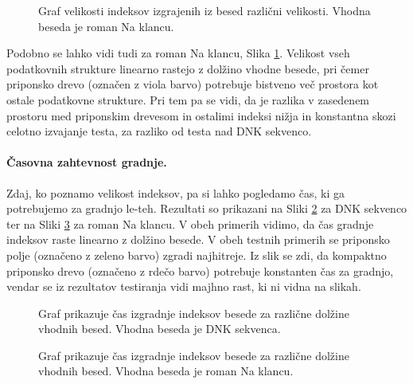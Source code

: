 \begin{figure}[tb]
    \centering
    
    \caption{Graf velikosti indeksov izgrajenih iz besed različni velikosti. Vhodna beseda je roman Na klancu.} 
    \label{fig:VelikostGrafSLO}
\end{figure}

Podobno se lahko vidi tudi za roman Na klancu, Slika \ref{fig:VelikostGrafSLO}. Velikost vseh podatkovnih strukture linearno rastejo z dolžino vhodne besede, pri čemer priponsko drevo (označen z viola barvo) potrebuje bistveno več prostora kot ostale podatkovne strukture. Pri tem pa se vidi, da je razlika v zasedenem prostoru med priponskim drevesom in ostalimi indeksi nižja in konstantna skozi celotno izvajanje testa, za razliko od testa nad DNK sekvenco.


\paragraph{Časovna zahtevnost gradnje.} 

Zdaj, ko poznamo velikost indeksov, pa si lahko pogledamo čas, ki ga potrebujemo za gradnjo le-teh. Rezultati so prikazani na Sliki \ref{fig:IzgradnjaGraf} za DNK sekvenco ter na Sliki \ref{fig:IzgradnjaGrafSLO} za roman Na klancu. V obeh primerih vidimo, da čas gradnje indeksov raste linearno z dolžino besede. V obeh testnih primerih se priponsko polje (označeno z zeleno barvo) zgradi najhitreje. Iz slik se zdi, da kompaktno priponsko drevo (označeno z rdečo barvo) potrebuje konstanten čas za gradnjo, vendar se iz rezultatov testiranja vidi majhno rast, ki ni vidna na slikah.

\begin{figure}[htb]
    \centering
    
    \caption{Graf prikazuje čas izgradnje indeksov besede za različne dolžine vhodnih besed. Vhodna beseda je DNK sekvenca.} 
    \label{fig:IzgradnjaGraf}
\end{figure}

\begin{figure}[htb]
    \centering
    
    \caption{Graf prikazuje čas izgradnje indeksov besede za različne dolžine vhodnih besed. Vhodna beseda je roman Na klancu.} 
    \label{fig:IzgradnjaGrafSLO}
\end{figure}

